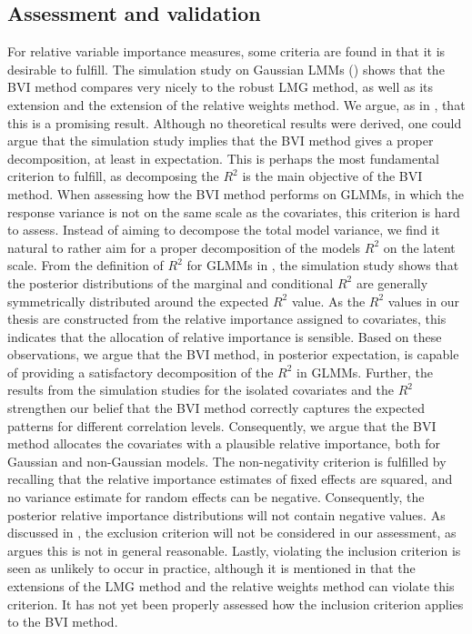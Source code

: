 \subsection*{Assessment and validation}
For relative variable importance measures, some criteria are found in  that it is desirable to fulfill. The simulation study on Gaussian LMMs () shows that the BVI method compares very nicely to the robust LMG method, as well as its extension and the extension of the relative weights method. We argue, as in \citet{Arnstad:Relative_variable_importance_in_Bayesian_linear_mixed_models:2024}, that this is a promising result. Although no theoretical results were derived, one could argue that the simulation study implies that the BVI method gives a proper decomposition, at least in expectation. This is perhaps the most fundamental criterion to fulfill, as decomposing the $R^2$ is the main objective of the BVI method.
When assessing how the BVI method performs on GLMMs, in which the response variance is not on the same scale as the covariates, this criterion is hard to assess. Instead of aiming to decompose the total model variance, we find it natural to rather aim for a proper decomposition of the models $R^2$ on the latent scale. From the definition of $R^2$ for GLMMs in \citet{nakagawa2013general}, the simulation study shows that the posterior distributions of the marginal and conditional $R^2$ are generally symmetrically distributed around the expected $R^2$ value. As the $R^2$ values in our thesis are constructed from the relative importance assigned to covariates, this indicates that the allocation of relative importance is sensible. Based on these observations, we argue that the BVI method, in posterior expectation, is capable of providing a satisfactory decomposition of the $R^2$ in GLMMs. Further, the results from the simulation studies for the isolated covariates and the $R^2$ strengthen our belief that the BVI method correctly captures the expected patterns for different correlation levels. Consequently, we argue that the BVI method allocates the covariates with a plausible relative importance, both for Gaussian and non-Gaussian models.
The non-negativity criterion is fulfilled by recalling that the relative importance estimates of fixed effects are squared, and no variance estimate for random effects can be negative. Consequently, the posterior relative importance distributions will not contain negative values. As discussed in \citet{Arnstad:Relative_variable_importance_in_Bayesian_linear_mixed_models:2024}, the exclusion criterion will not be considered in our assessment, as \citet{gromping_relaimpo} argues this is not in general reasonable. Lastly, violating  the inclusion criterion is seen as unlikely to occur in practice, although it is mentioned in \citet{matre} that the extensions of the LMG method and the relative weights method can violate this criterion. It has not yet been properly assessed how the inclusion criterion applies to the BVI method. 
